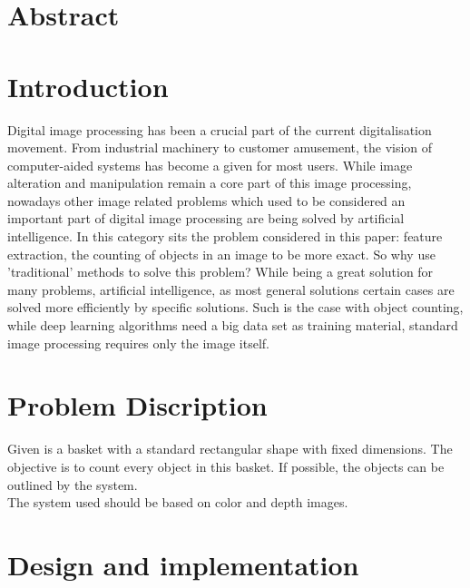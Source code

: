 \documentclass[11pt]{article}
\begin{document}


\section*{Abstract}
\thispagestyle{empty}

\newpage
\tableofcontents
\thispagestyle{empty}

\newpage
\listoftables
\thispagestyle{empty}

\newpage
\listoffigures
\thispagestyle{empty}

\newpage
\section{Introduction}
Digital image processing has been a crucial part of the current digitalisation movement. From industrial machinery to customer amusement, the vision of computer-aided systems has become a given for most users. While image alteration and manipulation remain a core part of this image processing, nowadays other image related problems which used to be considered an important part of digital image processing are being solved by artificial intelligence. In this category sits the problem considered in this paper: feature extraction, the counting of objects in an image to be more exact. So why use 'traditional' methods to solve this problem? While being a great solution for many problems, artificial intelligence, as most general solutions certain cases are solved more efficiently by specific solutions. Such is the case with object counting, while deep learning algorithms need a big data set  as training material, standard image processing requires only the image itself.

\section{Problem Discription}

\hspace{\parindent} Given is a basket with a standard rectangular shape with fixed dimensions. The objective is to count every object in this basket. If possible, the objects can be outlined by the system.\\

\noindent The system used should be based on color and depth images.


\section{Design and implementation}
\end{document}
